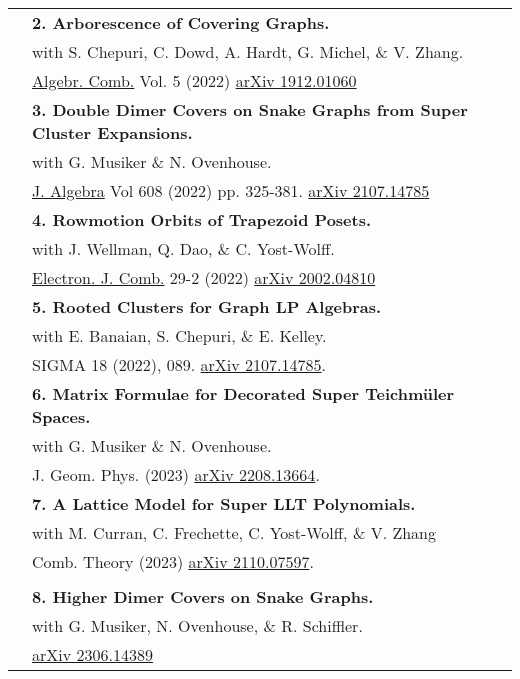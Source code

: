 \documentclass[letterpaper, 11pt,times]{article}
\newcommand{\mycolor}[0]{\color{RoyalBlue}}
\newlength{\myl}
\newcommand{\ind}[0]{\hspace{\myl}}
\newlength{\newl}
\newcommand{\paper}[2]{
\settowidth{\newl}{\textbf{#1. \ }}
\noindent
\hspace{\dimexpr\myl - \newl}
\textbf{#1. #2}
}
\begin{document}
\begin{longtable}{p{1in}p{5in}}
&\paper{2}{Arborescence of Covering Graphs.} \\
&\ind  with S. Chepuri, C. Dowd, A. Hardt, G. Michel, \& V. Zhang.\\
&\ind     \href{https://doi.org/10.5802/alco.212}{Algebr. Comb.} Vol. 5 (2022) \href{https://arxiv.org/abs/1912.01060}{arXiv 1912.01060}\\

&\paper{3}{Double Dimer Covers on Snake Graphs from Super Cluster Expansions.}\\
&\ind  with G. Musiker \& N. Ovenhouse.\\
&\ind  \href{https://doi.org/10.1016/j.jalgebra.2022.05.033}{J. Algebra} Vol 608 (2022) pp. 325-381. \href{https://arxiv.org/abs/2107.14785}{arXiv 2107.14785}\\

&\paper{4}{Rowmotion Orbits of Trapezoid Posets.}\\
&\ind  with J. Wellman, Q. Dao, \& C. Yost-Wolff.\\
&\ind   \href{https://doi.org/10.37236/9769}{Electron. J. Comb.} 29-2 (2022) \href{https://arxiv.org/abs/2002.04810}{arXiv 2002.04810}\\

&\paper{5}{Rooted Clusters for Graph LP Algebras.}\\
&\ind  with E. Banaian, S. Chepuri, \& E. Kelley.\\
&\ind SIGMA 18 (2022), 089. \href{https://arxiv.org/abs/2107.14785}{arXiv 2107.14785}. \\

&\paper{6}{Matrix Formulae for Decorated Super Teichm\"uler Spaces.} \\
&\ind  with  G. Musiker \& N. Ovenhouse. \\
&\ind  J. Geom. Phys. (2023) \href{https://arxiv.org/abs/2208.13664}{arXiv 2208.13664}. \\

&\paper{7}{A Lattice Model for Super LLT Polynomials.} \\
&\ind  with M. Curran, C. Frechette, C. Yost-Wolff, \& V. Zhang\\
&\ind  Comb. Theory (2023) \href{https://arxiv.org/abs/2110.07597}{arXiv 2110.07597}. \\

&\\

\nohyphens{\mycolor{Preprints}}
&\paper{8}{Higher Dimer Covers on Snake Graphs.}\\
&\ind  with  G. Musiker, N. Ovenhouse, \& R. Schiffler. \\
&\ind \href{https://arxiv.org/abs/2306.14389}{arXiv 2306.14389}\\


\end{longtable}
\end{document}
